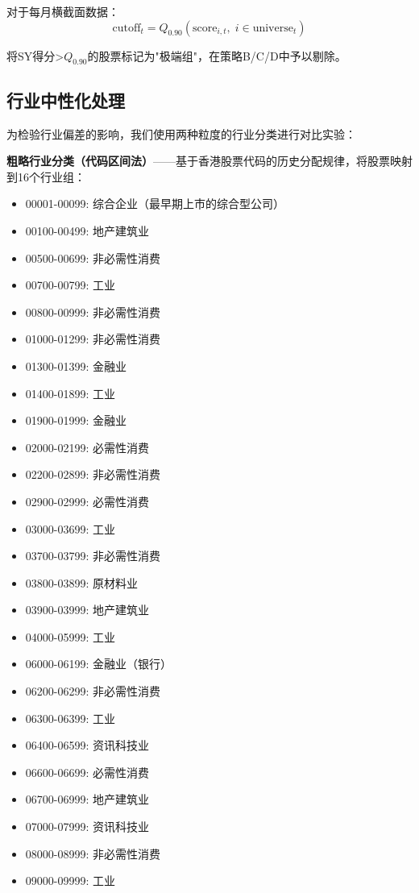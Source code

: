 \documentclass[10pt,a4paper]{ctexart}
\begin{document}
对于每月横截面数据：
\begin{equation}
\text{cutoff}_t = Q_{0.90}(\text{score}_{i,t}, \; i \in \text{universe}_t)
\end{equation}

将SY得分>$Q_{0.90}$的股票标记为"极端组"，在策略B/C/D中予以剔除。

\subsection{行业中性化处理}

为检验行业偏差的影响，我们使用两种粒度的行业分类进行对比实验：

\textbf{粗略行业分类（代码区间法）}——基于香港股票代码的历史分配规律，将股票映射到16个行业组：
\begin{itemize}
    \item 00001-00099: 综合企业（最早期上市的综合型公司）
    \item 00100-00499: 地产建筑业
    \item 00500-00699: 非必需性消费
    \item 00700-00799: 工业
    \item 00800-00999: 非必需性消费
    \item 01000-01299: 非必需性消费
    \item 01300-01399: 金融业
    \item 01400-01899: 工业
    \item 01900-01999: 金融业
    \item 02000-02199: 必需性消费
    \item 02200-02899: 非必需性消费
    \item 02900-02999: 必需性消费
    \item 03000-03699: 工业
    \item 03700-03799: 非必需性消费
    \item 03800-03899: 原材料业
    \item 03900-03999: 地产建筑业
    \item 04000-05999: 工业
    \item 06000-06199: 金融业（银行）
    \item 06200-06299: 非必需性消费
    \item 06300-06399: 工业
    \item 06400-06599: 资讯科技业
    \item 06600-06699: 必需性消费
    \item 06700-06999: 地产建筑业
    \item 07000-07999: 资讯科技业
    \item 08000-08999: 非必需性消费
    \item 09000-09999: 工业
\end{itemize}
\end{document}
